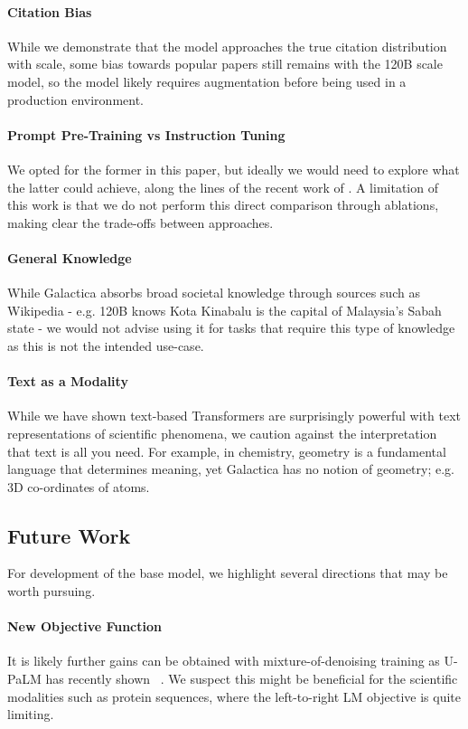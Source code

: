 {\paragraph{Citation Bias} While we demonstrate that the model approaches the true citation distribution with scale, some bias towards popular papers still remains with the 120B scale model, so the model likely requires augmentation before being used in a production environment.

\paragraph{Prompt Pre-Training vs Instruction Tuning} We opted for the former in this paper, but ideally we would need to explore what the latter could achieve, along the lines of the recent work of \citet{FLANPALM}. A limitation of this work is that we do not perform this direct comparison through ablations, making clear the trade-offs between approaches.

\paragraph{General Knowledge} While Galactica absorbs broad societal knowledge through sources such as Wikipedia - e.g. 120B knows Kota Kinabalu is the capital of Malaysia’s Sabah state - we would not advise using it for tasks that require this type of knowledge as this is not the intended use-case.

\paragraph{Text as a Modality} While we have shown text-based Transformers are surprisingly powerful with text representations of scientific phenomena, we caution against the interpretation that text is all you need. For example, in chemistry, geometry is a fundamental language that determines meaning, yet Galactica has no notion of geometry; e.g. 3D co-ordinates of atoms.

\subsection{Future Work}

For development of the base model, we highlight several directions that may be worth pursuing.

\paragraph{New Objective Function} It is likely further gains can be obtained with mixture-of-denoising training as U-PaLM has recently shown ~\citep{UPALM, FLANPALM}. We suspect this might be beneficial for the scientific modalities such as protein sequences, where the left-to-right LM objective is quite limiting.

}
